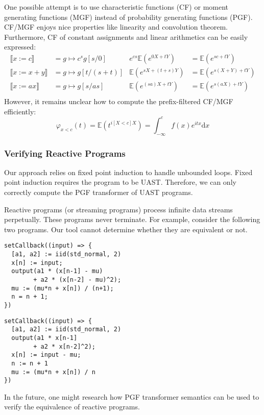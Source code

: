 \documentclass[a4paper]{article}
\renewcommand{\S}[1]{ \llbracket #1 \rrbracket }
\newcommand{\E}{ \mathbb{E} }
\begin{document}
One possible attempt is to use characteristic functions (CF) or moment generating functions (MGF) instead of probability generating functions (PGF).
CF/MGF enjoys nice properties like linearity and convolution theorem. Furthermore, CF of constant assignments and linear arithmetics can be easily expressed:
\begin{align*}
	\S{x:= c}   & = g\mapsto c^s g[s/0] & e^{cs} \E(e^{0X + tY}) & = \E(e^{sc + tY})     \\
	\S{x:= x+y} & = g\mapsto g[t/(s+t)] & \E(e^{sX + (t+s)Y})    & = \E(e^{s(X+Y) + tY}) \\
	\S{x:= ax}  & = g\mapsto g[s/as]    & \E(e^{(sa)X + tY})     & = \E(e^{s(aX) + tY})  \\
\end{align*}
However, it remains unclear how to compute the prefix-filtered CF/MGF efficiently:
\[
	\varphi_{x<c}(t) = \E(t^{i[X<c]X}) = \int_{-\infty}^c f(x) e^{itx} \mathrm{d}x
\]

\subsubsection{Verifying Reactive Programs}

Our approach relies on fixed point induction to handle unbounded loops. Fixed point induction requires the program to be UAST.
Therefore, we can only correctly compute the PGF transformer of UAST programs.\par
Reactive programs (or streaming programs) process infinite data streams perpetually. These programs never terminate.
For example, consider the following two programs. Our tool cannot determine whether they are equivalent or not.

\noindent \begin{minipage}[t]{0.45\textwidth}
	\begin{tcolorbox}
		\begin{verbatim}
setCallback((input) => {
  [a1, a2] := iid(std_normal, 2)
  x[n] := input;
  output(a1 * (x[n-1] - mu)
        + a2 * (x[n-2] - mu)^2);
  mu := (mu*n + x[n]) / (n+1);
  n = n + 1;
})\end{verbatim}
	\end{tcolorbox}
\end{minipage}
\hspace{2ex}
\begin{minipage}[t]{0.45\textwidth}
	\begin{tcolorbox}
		\begin{verbatim}
setCallback((input) => {
  [a1, a2] := iid(std_normal, 2)
  output(a1 * x[n-1]
        + a2 * x[n-2]^2);
  x[n] := input - mu;
  n := n + 1
  mu := (mu*n + x[n]) / n
})\end{verbatim}
	\end{tcolorbox}
\end{minipage}

In the future, one might research how PGF transformer semantics can be used to verify the equivalence of reactive programs.

\appendix
\setlength{\parskip}{0pt}
\nocite{*}
\printbibliography
\end{document}
